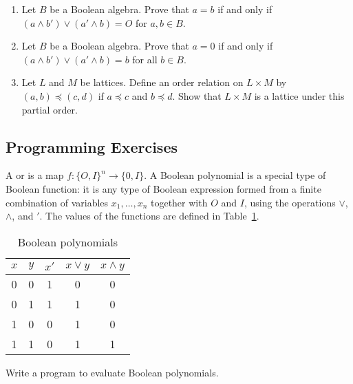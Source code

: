 {\begin{enumerate}
 
\item
Let $B$ be a Boolean algebra. Prove that $a = b$ if and only if 
$(a \wedge b') \vee ( a' \wedge b) = O$ for $a, b \in B$.
 
\item
Let $B$ be a Boolean algebra. Prove that $a = 0$ if and only if 
$(a \wedge b') \vee ( a' \wedge b) = b$ for all $b \in B$.
 
\item
Let $L$ and $M$ be lattices. Define an order relation on $L \times M$
by $( a, b) \preceq (c, d)$ if $a \preceq c$ and $b \preceq d$. Show
that $L \times M$ is a lattice under this partial order.
 
\end{enumerate}
 
 
 
}
 
 
\subsection*{Programming Exercises}
 
{\small
 
 
A  or
 is a map $f : \{O, I\}^n
\rightarrow \{ 0, I\}$. A Boolean polynomial is a special type of
Boolean function: it is any type of Boolean expression formed from a
finite combination of variables $x_1, \ldots, x_n$ together with $O$
and $I$, using the operations $\vee$, $\wedge$, and $'$. The values of
the functions are defined in Table~\ref{BooleanPoly}. 
\begin{table} 
\caption{Boolean polynomials}{\small
\label{BooleanPoly}
\begin{center}
\begin{tabular}{|cc|ccc|}
\hline
$x$ & $y$ & $x'$ & $x \vee y$ & $x \wedge y$ \\ \hline
0   & 0   & 1    & 0          & 0            \\
0   & 1   & 1    & 1          & 0            \\
1   & 0   & 0    & 1          & 0            \\
1   & 1   & 0    & 1          & 1            \\
\hline
\end{tabular}
\end{center}
}
\end{table}
Write a program to evaluate Boolean polynomials.  
}
 
